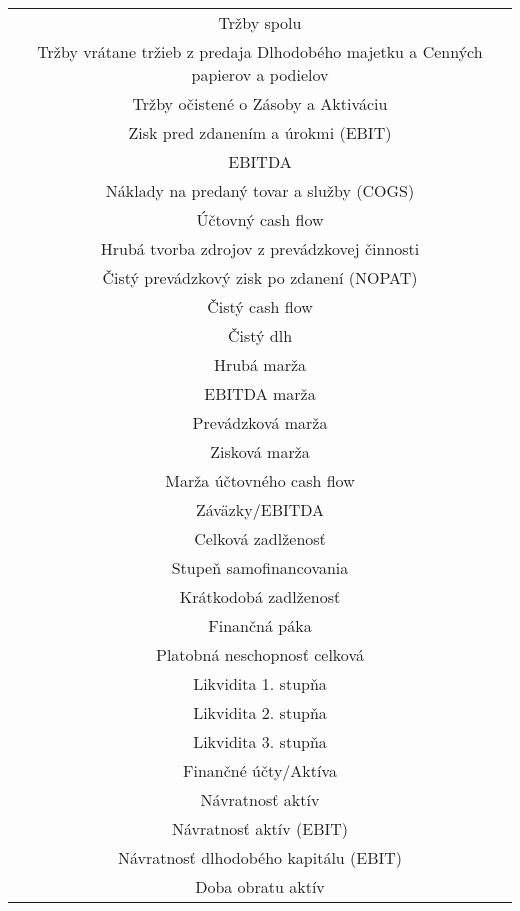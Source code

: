 \begin{longtable}{ |c| }
        \hline
        Tržby spolu \\
        Tržby vrátane tržieb z predaja Dlhodobého majetku a Cenných papierov a podielov \\
        Tržby očistené o Zásoby a Aktiváciu \\
        \hline
        Zisk pred zdanením a úrokmi (EBIT) \\
        EBITDA \\
        \hline
        Náklady na predaný tovar a služby (COGS) \\
        \hline
        Účtovný cash flow \\
        Hrubá tvorba zdrojov z prevádzkovej činnosti \\
        Čistý prevádzkový zisk po zdanení (NOPAT) \\
        Čistý cash flow \\
        Čistý dlh \\
        \hline
        Hrubá marža \\
        EBITDA marža \\
        Prevádzková marža \\
        Zisková marža \\
        Marža účtovného cash flow \\
        \hline
        Záväzky/EBITDA \\
        \hline
        Celková zadlženosť \\
        Stupeň samofinancovania \\
        Krátkodobá zadlženosť \\
        Finančná páka \\
        \hline
        Platobná neschopnosť celková \\
        \hline
        Likvidita 1. stupňa \\
        Likvidita 2. stupňa \\
        Likvidita 3. stupňa \\
        \hline
        Finančné účty/Aktíva \\
        \hline
        Návratnosť aktív \\
        Návratnosť aktív (EBIT) \\
        Návratnosť dlhodobého kapitálu (EBIT) \\
        \hline
        Doba obratu aktív \\

\end{longtable}
